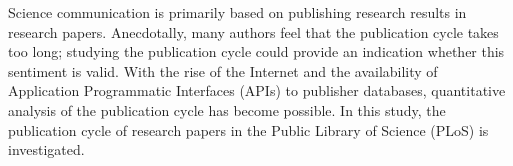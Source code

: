 Science communication is primarily based on publishing research results in research papers. Anecdotally, many authors feel that the publication cycle takes too long; studying the publication cycle could provide an indication whether this sentiment is valid. With the rise of the Internet and the availability of Application Programmatic Interfaces (APIs) to publisher databases, quantitative analysis of the publication cycle has become possible. In this study, the publication cycle of research papers in the Public Library of Science (PLoS) is investigated.